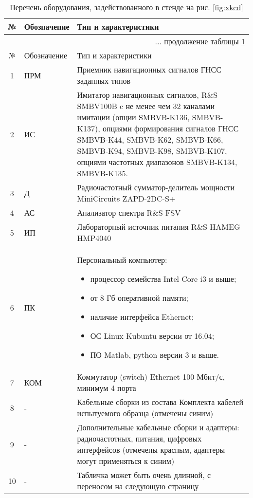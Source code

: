 	\begin{longtable}{|c|p{4cm}|p{12cm}|}
		\caption{Перечень оборудования, задействованного в стенде на рис. \ref{fig:xkcd}} \label{tab:stend_eqip}\\
		\hline 
		№ & Обозначение & Тип и характеристики  \\		
		\endfirsthead
		\multicolumn{3}{r}{... продолжение таблицы \ref{tab:stend_eqip}}\\ [1em] %
		\hline 
		№ & Обозначение & Тип и характеристики  \\
		\endhead
		\hline
		
		1 &  ПРМ                       & Приемник навигационных сигналов ГНСС заданных типов \\ 
		\hline 
		
		2 &  ИС  &  Имитатор навигационных сигналов, R\&S SMBV100B c не менее чем 32 каналами имитации (опции SMBVB-K136, SMBVB-K137), опциями формирования сигналов ГНСС SMBVB-K44, SMBVB-K62, SMBVB-K66, SMBVB-K94, SMBVB-K98, SMBVB-K107, опциями частотных диапазонов SMBVB-K134, SMBVB-K135.
		\\ 
		\hline 
		
		3 & Д                         & Радиочастотный сумматор-делитель мощности MiniCircuits ZAPD-2DC-S+  \\
		\hline
		
		4 & АС                         & Анализатор спектра R\&S FSV \\
		\hline
		
		5 & ИП                         & Лабораторный источник питания R\&S HAMEG HMP4040 \\
		\hline
		
		6 & ПК                         & Персональный компьютер: 
		\begin{itemize}
			\item процессор семейства Intel Core i3 и выше; 
			\item от 8 Гб оперативной памяти;
			\item наличие интерфейса Ethernet;
			\item ОС Linux Kubuntu версии от 16.04;
			\item ПО Matlab, python версии 3 и выше.
		\end{itemize} 
		\\ 
		\hline 
		
		7 & КОМ & Коммутатор (switch) Ethernet 100 Мбит/с, минимум 4 порта \\ 
		\hline 
		
		8 & -          & Кабельные сборки из состава Комплекта кабелей испытуемого образца (отмечены синим)  \\ 
		\hline 
		
		9 & -          & Дополнительные кабельные сборки и адаптеры: радиочастотных, питания, цифровых интерфейсов (отмечены красным, адаптеры могут применяться к синим) \\ 
		\hline 

		10 & -         & Табличка может быть очень длинной, с переносом на следующую страницу \\ 
		\hline 		
		
	\end{longtable}

